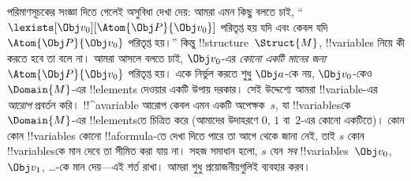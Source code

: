 \documentclass[../../../include/open-logic-section]{subfiles}
\begin{document}
পরিমাণসূচকের সংজ্ঞা দিতে গেলেই অসুবিধা দেখা দেয়: আমরা এমন কিছু বলতে চাই,
“$\lexists[\Obj v_0][\Atom{\Obj P}{\Obj v_0}]$ পরিতৃপ্ত হয় যদি এবং
কেবল যদি $\Atom{\Obj P}{\Obj v_0}$ পরিতৃপ্ত হয়।” কিন্তু
!!{structure}~$\Struct{M}$, !!{variable}s নিয়ে কী করতে হবে তা বলে না।
আমরা আসলে বলতে চাই, $\Obj v_0$-এর \emph{কোনো একটি মানের জন্য}
$\Atom{\Obj P}{\Obj v_0}$ পরিতৃপ্ত হয়। একে নির্ভুল করতে শুধু $\Obj a$-কে
নয়, $\Obj v_0$-কেও~$\Domain{M}$-এর !!{element}s দেওয়ার একটি উপায়
দরকার। সেই উদ্দেশ্যে আমরা !!{variable}-এর \emph{আরোপ} প্রবর্তন করি।
!!^a{variable} আরোপ কেবল এমন একটি অপেক্ষক~$s$, যা !!{variable}sকে
$\Domain{M}$-এর !!{element}sতে চিত্রিত করে (আমাদের উদাহরণে $0$, $1$ বা~$2$-এর
কোনো একটিতে)। কোন কোন !!{variable}s কোনো !!a{formula}-তে দেখা দিতে পারে
তা আগে থেকে জানা নেই, তাই $s$ কোন !!{variable}sকে মান দেবে তা সীমিত
করা যায় না। সহজ সমাধান হলো, $s$ যেন \emph{সব} !!{variable}s~$\Obj v_0$,
$\Obj v_1$, \dots-কে মান দেয়—এই শর্ত রাখা। আমরা শুধু প্রয়োজনীয়গুলিই
ব্যবহার করব।
\end{document}
